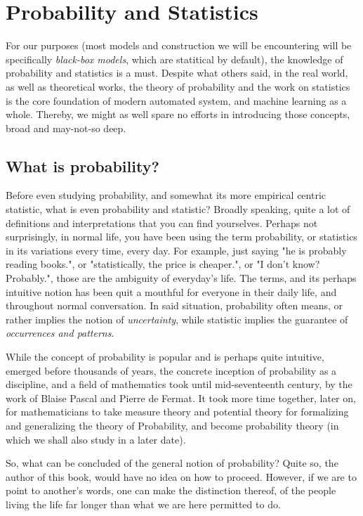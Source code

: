 \chapter{Probability and Statistics}
For our purposes (most models and construction we will be encountering will be specifically \textit{black-box models}, which are statitical by default), the knowledge of probability and statistics is a must. Despite what others said, in the real world, as well as theoretical works, the theory of probability and the work on statistics is the core foundation of modern automated system, and machine learning as a whole. Thereby, we might as well spare no efforts in introducing those concepts, broad and may-not-so deep.

\section{What is probability?}

Before even studying probability, and somewhat its more empirical centric statistic, what is even probability and statistic? Broadly speaking, quite a lot of definitions and interpretations that you can find yourselves. Perhaps not surprisingly, in normal life, you have been using the term probability, or statistics in its variations every time, every day. For example, just saying "he is probably reading books.", or "statistically, the price is cheaper.", or "I don't know? Probably.", those are the ambiguity of everyday's life. The terms, and its perhaps intuitive notion has been quit a mouthful for everyone in their daily life, and throughout normal conversation. In said situation, probability often means, or rather implies the notion of \textit{uncertainty}, while statistic implies the guarantee of \textit{occurrences and patterns}. 

While the concept of probability is popular and is perhaps quite intuitive, emerged before thousands of years, the concrete inception of probability as a discipline, and a field of mathematics took until mid-seventeenth century, by the work of Blaise Pascal and Pierre de Fermat. It took more time together, later on, for mathematicians to take measure theory and potential theory for formalizing and generalizing the theory of Probability, and become probability theory (in which we shall also study in a later date). 

So, what can be concluded of the general notion of probability? Quite so, the author of this book, would have no idea on how to proceed. However, if we are to point to another's words, one can make the distinction thereof, of the people living the life far longer than what we are here permitted to do. 

